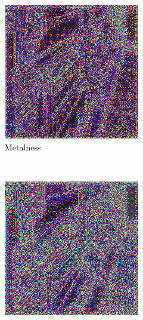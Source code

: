 \begin{figure}[h!]
\begin{subfigure}[b]{0.175\textwidth}
     \includegraphics[width=\textwidth]{figures/result/quadruple/depth_albedo_normal_metalness/1.png}
     \caption{Metalness}
    \end{subfigure}
    ~
    \begin{subfigure}[b]{0.175\textwidth}
     \includegraphics[width=\textwidth]{figures/result/quadruple/depth_albedo_normal_position/1.png}

\end{subfigure}
\end{figure}
